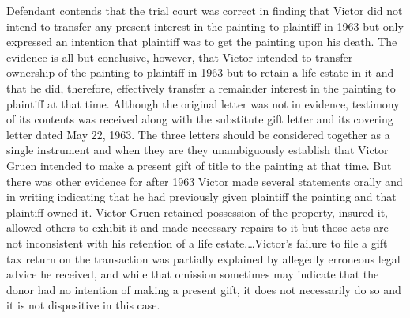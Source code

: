 Defendant contends that the trial court was correct in finding that Victor did
not intend to transfer any present interest in the painting to plaintiff in
1963 but only expressed an intention that plaintiff was to get the painting
upon his death. The evidence is all but conclusive, however, that Victor
intended to transfer ownership of the painting to plaintiff in 1963 but to
retain a life estate in it and that he did, therefore, effectively transfer a
remainder interest in the painting to plaintiff at that time. Although the
original letter was not in evidence, testimony of its contents was received
along with the substitute gift letter and its covering letter dated May 22,
1963. The three letters should be considered together as a single instrument
and when they are they unambiguously establish that Victor Gruen intended to
make a present gift of title to the painting at that time. But there was other
evidence for after 1963 Victor made several statements orally and in writing
indicating that he had previously given plaintiff the painting and that
plaintiff owned it. Victor Gruen retained possession of the property, insured
it, allowed others to exhibit it and made necessary repairs to it but those
acts are not inconsistent with his retention of a life estate.\dots Victor's
failure to file a gift tax return on the transaction was partially explained by
allegedly erroneous legal advice he received, and while that omission sometimes
may indicate that the donor had no intention of making a present gift, it does
not necessarily do so and it is not dispositive in this case. 


